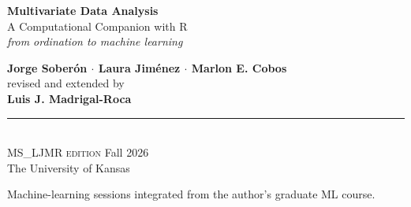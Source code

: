 \documentclass[11pt,oneside]{book}
\newcommand{\R}{\textsf{R}}
\begin{document}

\begin{titlepage}
\thispagestyle{empty}
\vspace*{1.2cm}
\begin{flushleft}\hspace{1.6cm}
\begin{minipage}{0.86\textwidth}
  \color{white}\sffamily
  {\fontsize{30}{34}\selectfont\bfseries Multivariate Data Analysis}\\[6pt]
  {\LARGE A Computational Companion with \R}\\[10pt]
  {\large\itshape from ordination to machine learning}
\end{minipage}
\end{flushleft}
\vspace{6.4cm}
\vspace{6.4cm}
\begin{flushright}
	\begin{minipage}{0.8\textwidth}\raggedleft\sffamily
		{\Large\bfseries\color{wnavy} Jorge Sober\'on \;$\cdot$\; Laura Jim\'enez \;$\cdot$\; Marlon E. Cobos}\\[4pt]
		{\large\color{wgray} revised and extended by}\\[2pt]
		{\Large\bfseries\color{wwine} Luis J. Madrigal-Roca}\\[16pt]
		{\color{wgray}\rule{0.5\textwidth}{0.8pt}}\\[6pt]
		{\large\color{wgray}\textsc{MS\_LJMR edition}\;\textbullet\; Fall 2026}\\
		{\small\color{wgray} The University of Kansas}
	\end{minipage}\hspace*{2cm} %
\end{flushright}
\vfill
\begin{center}\sffamily\small\color{wgray}
  Machine-learning sessions integrated from the author's graduate ML course.
\end{center}
\vspace{1cm}
\restoregeometry
\end{titlepage}
\end{document}
